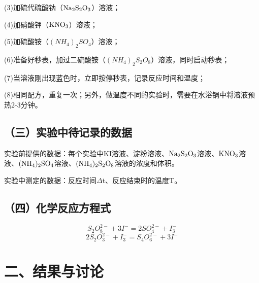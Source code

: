 \documentclass[a4paper,12pt]{article}
\begin{document}
(3)加硫代硫酸钠（$\rm Na_2S_2O_3$）溶液；

(4)加硝酸钾（$\rm KNO_3$）溶液；

(5)加硫酸铵（$(NH_4)_2SO_4$）溶液；

(6)准备好秒表，加过二硫酸铵（$(NH_4)_2S_2O_8$）溶液，同时启动秒表；

(7)当溶液刚出现蓝色时，立即按停秒表，记录反应时间和温度；

(8)相同配方，重复一次；另外，做温度不同的实验时，需要在水浴锅中将溶液预热2-3分钟。

\subsection*{（三）实验中待记录的数据}
实验前提供的数据：每个实验中KI溶液、淀粉溶液、$\rm Na_2S_2O_3$溶液、$\rm KNO_3$溶液、$\rm (NH_4)_2SO_4$溶液、$\rm (NH_4)_2S_2O_8$溶液的浓度和体积。

实验中测定的数据：反应时间$\Delta$t、反应结束时的温度T。

\subsection*{（四）化学反应方程式}
$$
S_2O_8^{2-}+3I^-=2SO_4^{2-}+I_3^-
$$$$
2S_2O_3^{2-}+I_3^-=S_4O_6^{2-}+3I^-
$$

\section*{二、结果与讨论}
\end{document}
